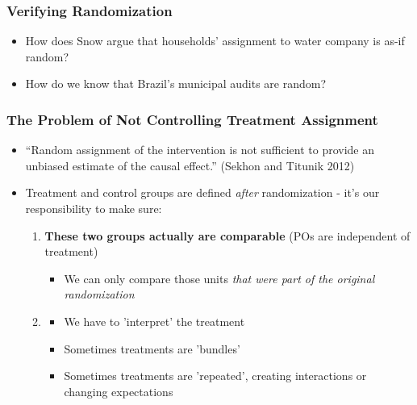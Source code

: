 \documentclass[xcolor=x11names,compress]{beamer}\usepackage[]{graphicx}\usepackage[]{color}
\renewcommand{\(}{\begin{columns}}
\renewcommand{\)}{\end{columns}}
\newcommand{\<}[1]{\begin{column}{#1}}
\renewcommand{\>}{\end{column}}
\begin{document}
\begin{frame}
\frametitle{Verifying Randomization}
\begin{itemize}
\item How does Snow argue that households' assignment to water company is as-if random?
\pause
\item How do we know that Brazil's municipal audits are random?
\end{itemize}
\end{frame}


\begin{frame}
\frametitle{The Problem of Not Controlling Treatment Assignment}
\begin{itemize}
\item ``Random assignment of the intervention is not sufficient to provide an unbiased estimate of the causal effect.'' (Sekhon and Titunik 2012)
\pause
\item Treatment and control groups are defined \textit{after} randomization - it's our responsibility to make sure:
\pause
\begin{enumerate}
\item \textbf{These two groups actually are comparable} (POs are independent of treatment)
\pause
\begin{itemize}
\item We can only compare those units \textit{that were part of the original randomization}
\end{itemize}
\pause
\item {}
\pause
\begin{itemize}
\item We have to 'interpret' the treatment
\pause
\item Sometimes treatments are 'bundles'
\pause
\item Sometimes treatments are 'repeated', creating interactions or changing expectations
\end{itemize}
\end{enumerate}
\end{itemize}
\end{frame}
\end{document}
